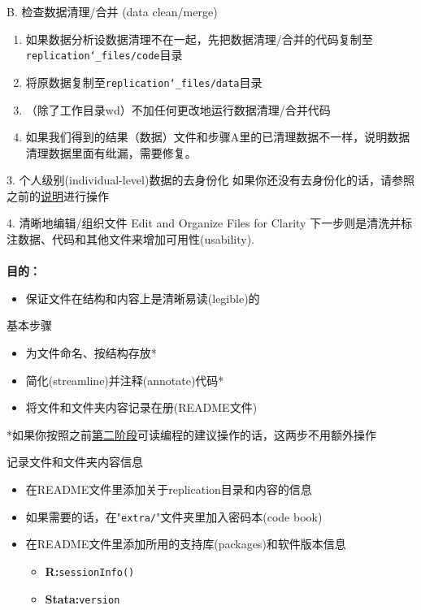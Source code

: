 \documentclass{beamer}
\begin{document}
\begin{frame}{B. 检查数据清理/合并 (data clean/merge)}
\begin{enumerate}
    \item 如果数据分析设数据清理不在一起，先把数据清理/合并的代码复制至\texttt{replication\char`_files/code}目录
    \item 将原数据复制至\texttt{replication\char`_files/data}目录
    \item （除了工作目录wd）不加任何更改地运行数据清理/合并代码
    \item 如果我们得到的结果（数据）文件和步骤A里的已清理数据不一样，说明数据清理数据里面有纰漏，需要修复。
\end{enumerate}
\end{frame}

\begin{frame}{3. 个人级别(individual-level)数据的去身份化}
如果你还没有去身份化的话，请参照之前的\hyperlink{deidentify}{说明}进行操作
\end{frame}

\begin{frame}{4. 清晰地编辑/组织文件 Edit and Organize Files for Clarity}
\label{clarity}
下一步则是清洗并标注数据、代码和其他文件来增加可用性(usability). \\~\\

\textbf{目的：}
\begin{itemize}
    \item 保证文件在结构和内容上是\alert{清晰易读(legible)}的
\end{itemize}
\end{frame}

\begin{frame}{基本步骤}
\begin{itemize}
    \item 为文件命名、按结构存放*
    \item 简化(streamline)并注释(annotate)代码*
    \item 将文件和文件夹内容记录在册(README文件)
\end{itemize}
\alert{*如果你按照之前\hyperlink{phaseII}{第二阶段}可读编程的建议操作的话，这两步不用额外操作}
\end{frame}

\begin{frame}{记录文件和文件夹内容信息}
\begin{itemize}
    \item 在README文件里添加关于replication目录和内容的信息
    \item 如果需要的话，在"\texttt{extra/}"文件夹里加入密码本(code book)
    \item 在README文件里添加所用的支持库(packages)和软件版本信息
    \begin{itemize}
        \item \textbf{R:}\texttt{sessionInfo()}
        \item \textbf{Stata:}\texttt{version}
    \end{itemize}
\end{itemize}
\end{frame}
\end{document}
